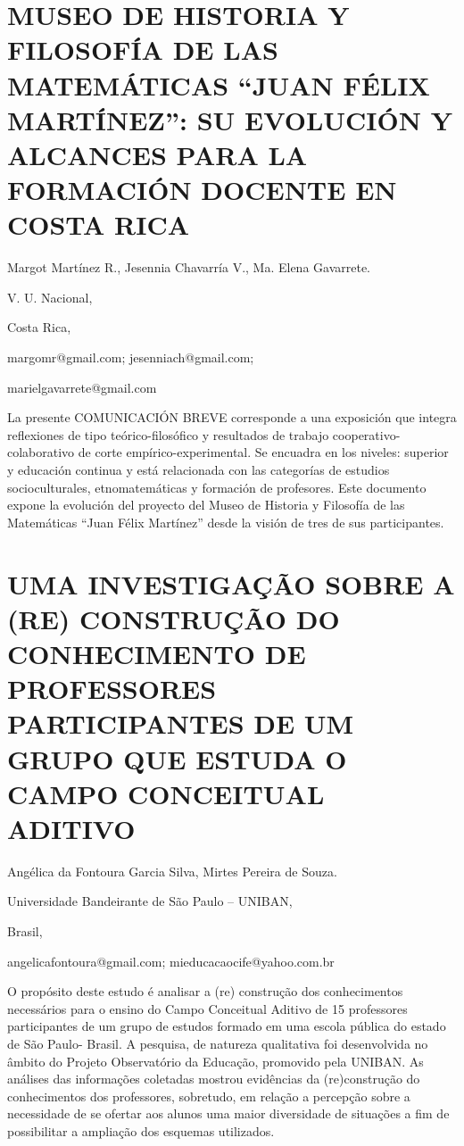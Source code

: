 \setcounter{section}{81}


\section{MUSEO DE HISTORIA Y FILOSOFÍA DE LAS MATEMÁTICAS “JUAN FÉLIX MARTÍNEZ”:
SU EVOLUCIÓN Y ALCANCES PARA LA FORMACIÓN DOCENTE EN COSTA RICA}

\begin{datos}

Margot Martínez R., Jesennia Chavarría V., Ma. Elena Gavarrete.

V. U. Nacional, 

Costa Rica,

margomr@gmail.com; jesenniach@gmail.com;

marielgavarrete@gmail.com 

\end{datos}

La presente COMUNICACIÓN BREVE corresponde a una exposición que integra
reflexiones de tipo teórico-filosófico y resultados de trabajo cooperativo-colaborativo
de corte empírico-experimental. Se encuadra en los niveles: superior
y educación continua y está relacionada con las categorías de estudios
socioculturales, etnomatemáticas y formación de profesores. Este documento
expone la evolución del proyecto del Museo de Historia y Filosofía
de las Matemáticas “Juan Félix Martínez” desde la visión de tres de
sus participantes.


\section{UMA INVESTIGAÇÃO SOBRE A (RE) CONSTRUÇÃO DO CONHECIMENTO DE PROFESSORES
PARTICIPANTES DE UM GRUPO QUE ESTUDA O CAMPO CONCEITUAL ADITIVO }

\begin{datos}

Angélica da Fontoura Garcia Silva, Mirtes Pereira de Souza.

Universidade Bandeirante de São Paulo – UNIBAN,

Brasil,

angelicafontoura@gmail.com; mieducacaocife@yahoo.com.br 

\end{datos}

O propósito deste estudo é analisar a (re) construção dos conhecimentos
necessários para o ensino do Campo Conceitual Aditivo de 15 professores
participantes de um grupo de estudos formado em uma escola pública
do estado de São Paulo- Brasil. A pesquisa, de natureza qualitativa
foi desenvolvida no âmbito do Projeto Observatório da Educação, promovido
pela UNIBAN. As análises das informações coletadas mostrou evidências
da (re)construção do conhecimentos dos professores, sobretudo, em
relação a percepção sobre a necessidade de se ofertar aos alunos uma
maior diversidade de situações a fim de possibilitar a ampliação dos
esquemas utilizados. 


